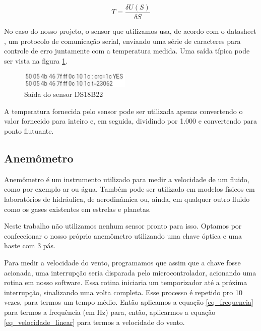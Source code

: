 \documentclass[twocolumn,11pt]{article}
\begin{document}
{\begin{equation} \label{eq_temperatura}
T = \frac{\delta U(S)}{\delta S}
\end{equation}

No caso do nosso projeto, o sensor que utilizamos usa, de acordo com o datasheet \cite{ds18b22ds}, um protocolo de comunicação serial, enviando uma série de caracteres para controle de erro juntamente com a temperatura medida. Uma saída típica pode ser vista na figura \ref{saida_sensor_temperatura}.\par

\begin{figure}
\includegraphics[width=200px]{sensor_temperatura.png}
\caption{Saída do sensor DS18B22}
\label{saida_sensor_temperatura}
\end{figure}

A temperatura fornecida pelo sensor pode ser utilizada apenas convertendo o valor fornecido para inteiro e, em seguida, dividindo por 1.000 e convertendo para ponto flutuante.\par

\subsection{Anemômetro}\label{desenvolvimento_anemometro}
Anemômetro é um instrumento utilizado para medir a velocidade de um fluido, como por exemplo ar ou água. Também pode ser utilizado em modelos físicos em laboratórios de hidráulica, de aerodinâmica ou, ainda, em qualquer outro fluido como os gases existentes em estrelas e planetas.\par
Neste trabalho não utilizamos nenhum sensor pronto para isso. Optamos por confeccionar o nosso próprio anemômetro utilizando uma chave óptica e uma haste com 3 pás.\par
Para medir a velocidade do vento, programamos que assim que a chave fosse acionada, uma interrupção seria disparada pelo microcontrolador, acionando uma rotina em nosso software. Essa rotina iniciaria um temporizador até a próxima interrupção, sinalizando uma volta completa. Esse processo é repetido pro 10 vezes, para termos um tempo médio. Então aplicamos a equação \ref{eq_frequencia} para termos a frequência (em Hz) para, então, aplicarmos a equação \ref{eq_velocidade_linear} para termos a velocidade do vento.\par

}
\end{document}
